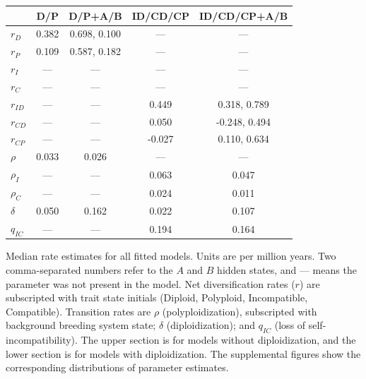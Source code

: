 \begin{supptable}
\begin{center}
    \begin{tabular}{lcccc}
                       & D/P   & D/P+A/B      & ID/CD/CP & ID/CD/CP+A/B \\ \midrule
        $r_D$          & 0.382 & 0.698, 0.100 & ---      & ---          \\
        $r_P$          & 0.109 & 0.587, 0.182 & ---      & ---          \\
        $r_I$          & ---   & ---          & ---      & ---          \\
        $r_C$          & ---   & ---          & ---      & ---          \\
        $r_{ID}$       & ---   & ---          & 0.449    & 0.318, 0.789 \\
        $r_{CD}$       & ---   & ---          & 0.050    &-0.248, 0.494 \\
        $r_{CP}$       & ---   & ---          &-0.027    & 0.110, 0.634 \\
        $\rho$         & 0.033 & 0.026        & ---      & ---          \\
        $\rho_I$       & ---   & ---          & 0.063    & 0.047        \\
        $\rho_C$       & ---   & ---          & 0.024    & 0.011        \\
        $\delta$       & 0.050 & 0.162        & 0.022    & 0.107        \\
        $q_{IC}$       & ---   & ---          & 0.194    & 0.164        
    \end{tabular}


    \end{center}
    \caption{
        Median rate estimates for all fitted models.
        Units are per million years.
        Two comma-separated numbers refer to the $A$ and $B$ hidden states, and --- means the parameter was not present in the model.
    Net diversification rates ($r$) are subscripted with trait state initials (Diploid, Polyploid, Incompatible, Compatible). Transition rates are $\rho$ (polyploidization), subscripted with background breeding system state; $\delta$ (diploidization); and  $q_{IC}$ (loss of self-incompatibility).
    The upper section is for models without diploidization, and the lower section is for models with diploidization.
    The supplemental figures show the corresponding distributions of parameter estimates.
    }
    \label{table:estimates}
\end{supptable}

